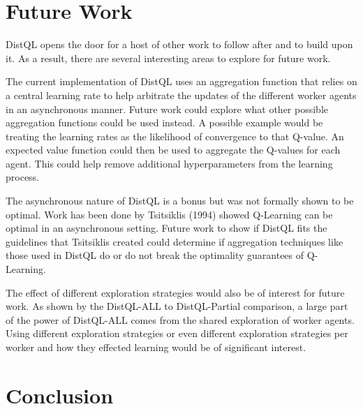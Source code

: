 \documentclass[jair,twoside,11pt,theapa]{article}
\begin{document}

\section{Future Work}
\label{future}
DistQL opens the door for a host of other work to follow after and to build upon it. As a result, there are several interesting areas to explore for future work. 

The current implementation of DistQL uses an aggregation function that relies on a central learning rate to help arbitrate the updates of the different worker agents in an asynchronous manner. Future work could explore what other possible aggregation functions could be used instead. A possible example would be treating the learning rates as the likelihood of convergence to that Q-value. An expected value function could then be used to aggregate the Q-values for each agent. This could help remove additional hyperparameters from the learning process.

The asynchronous nature of DistQL is a bonus but was not formally shown to be optimal. Work has been done by Tsitsiklis (1994) \nocite{Tsitsiklis1994} showed Q-Learning can be optimal in an asynchronous setting. Future work to show if DistQL fits the guidelines that Tsitsiklis created could determine if aggregation techniques like those used in DistQL do or do not break the optimality guarantees of Q-Learning. 

The effect of different exploration strategies would also be of interest for future work. As shown by the DistQL-ALL to DistQL-Partial comparison, a large part of the power of DistQL-ALL comes from the shared exploration of worker agents. Using different exploration strategies or even different exploration strategies per worker and how they effected learning would be of significant interest. 

\section{Conclusion}
\label{conclusion}


\vskip 0.2in


\end{document}
